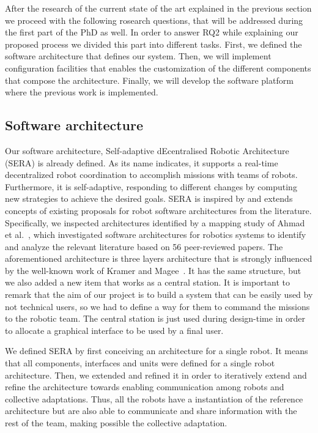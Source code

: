 After the research of the current state of the art explained in the previous section we proceed with the following rosearch questions, that will be addressed during the first part of the PhD as well.
In order to answer RQ2 while explaining our proposed process we divided this part into different tasks.
First, we defined the software architecture that defines our system.
Then, we will implement configuration facilities that enables the customization of the different components that compose the architecture.
Finally, we will develop the software platform where the previous work is implemented.

\subsection{Software architecture}
\label{sec:softwarearch}

Our software architecture, Self-adaptive dEcentralised Robotic Architecture (SERA) is already defined.
As its name indicates, it supports a real-time decentralized robot coordination to accomplish missions with teams of robots. 
Furthermore, it is self-adaptive, responding to different changes by computing new strategies to achieve the desired goals.
SERA is inspired by and extends concepts of existing proposals for robot software architectures from the literature. 
Specifically, we inspected architectures identified by a mapping study of Ahmad et al.~\cite{Ahmad201616}, which investigated software architectures for robotics systems to identify and analyze the relevant literature based on 56 peer-reviewed papers.
The aforementioned architecture is three layers architecture that is strongly influenced by the well-known work of Kramer and Magee~\cite{kramer}.
It has the same structure, but we also added a new item that works as a central station.
It is important to remark that the aim of our project is to build a system that can be easily used by not technical users, so we had to define a way for them to command the missions to the robotic team.
The central station is just used during design-time in order to allocate a graphical interface to be used by a final user.

We defined SERA by first conceiving an architecture for a single robot. 
It means that all components, interfaces and units were defined for a single robot architecture. 
Then, we extended and refined it in order to iteratively extend and refine the architecture towards enabling communication among robots and collective adaptations. 
Thus, all the robots have a instantiation of the reference architecture but are also able to communicate and share information with the rest of the team, making possible the collective adaptation. 

